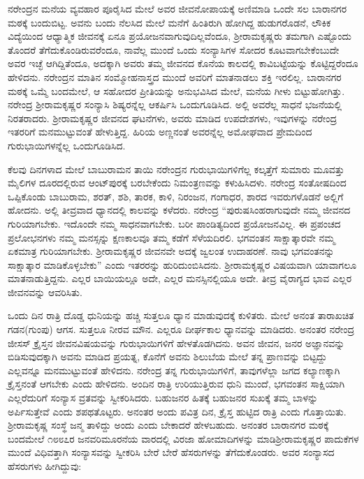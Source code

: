 ನರೇಂದ್ರನ ಮನೆಯ ವ್ಯವಹಾರ ಪೂರೈಸಿದ ಮೇಲೆ ಅವರ ಜೀವನೋಪಾಯಕ್ಕೆ ಅಣಿಮಾಡಿ ಒಂದೇ ಸಲ ಬಾರಾನಗರ ಮಠಕ್ಕೆ ಬಂದುಬಿಟ್ಟ. ಅವನು ಬಂದು ನೆಲಸಿದ ಮೇಲೆ ಮನೆಗೆ ಹಿಂತಿರುಗಿ ಹೋಗಿದ್ದ ಹುಡುಗರೊಡನೆ, ಲೌಕಿಕ ವಿದ್ಯೆಯಿಂದ ಆಧ್ಯಾತ್ಮಿಕ ಜೀವನಕ್ಕೆ ಏನೂ ಪ್ರಯೋಜನವಾಗುವುದಿಲ್ಲವೆಂದೂ, ಶ‍್ರೀರಾಮಕೃಷ್ಣರು ತಮಗಾಗಿ ಎಷ್ಟೊಂದು ತೊಂದರೆ ತೆಗೆದುಕೊಂಡಿರುವರೆಂದೂ, ನಾವೆಲ್ಲ ಮುಂದೆ ಒಂದು ಸಂನ್ಯಾಸಿಗಳ ಸೋದರ ಕೂಟವಾಗಬೇಕೆಂಬುದೇ ಅವರ ಇಚ್ಛೆ ಆಗಿದ್ದಿತೆಂದೂ, ಅದಕ್ಕಾಗಿ ಅವರು ತಮ್ಮ ಜೀವನದ ಕೊನೆಯ ಕಾಲದಲ್ಲಿ ಕಾವಿಬಟ್ಟೆಯನ್ನು ಕೊಟ್ಟಿದ್ದರೆಂದೂ ಹೇಳಿದನು. ನರೇಂದ್ರನ ಮಾತಿನ ಸಂಮ್ಮೋಹನಾಸ್ತ್ರದ ಮುಂದೆ ಅವರಿಗೆ ಮಾತನಾಡಲು ಶಕ್ತಿ ಇರಲಿಲ್ಲ. ಬಾರಾನಗರ ಮಠಕ್ಕೆ ಒಮ್ಮೆ ಬಂದಮೇಲೆ, ಆ ಸಹೋದರ ಪ್ರೀತಿಯನ್ನು ಅನುಭವಿಸಿದ ಮೇಲೆ, ಮನೆಯ ಗೀಳು ಬಿಟ್ಟುಹೋಗಿತ್ತು. ನರೇಂದ್ರ ಶ‍್ರೀರಾಮಕೃಷ್ಣರ ಸಂನ್ಯಾಸಿ ಶಿಷ್ಯರನ್ನೆಲ್ಲ ಆಕರ್ಷಿಸಿ ಒಂದುಗೂಡಿಸಿದ. ಅಲ್ಲಿ ಅವರೆಲ್ಲ ಸಾಧನೆ ಭಜನೆಯಲ್ಲಿ ನಿರತರಾದರು. ಶ‍್ರೀರಾಮಕೃಷ್ಣರ ಜೀವನದ ಘಟನೆಗಳು, ಅವರು ಮಾಡಿದ ಉಪದೇಶಗಳು, ಇವುಗಳನ್ನು ನರೇಂದ್ರ ಇತರರಿಗೆ ಮನಮುಟ್ಟುವಂತೆ ಹೇಳುತ್ತಿದ್ದ. ಹಿರಿಯ ಅಣ್ಣನಂತೆ ಅವರನ್ನೆಲ್ಲ ಅಮೋಘವಾದ ಪ್ರೇಮದಿಂದ ಗುರುಭಾಯಿಗಳನ್ನೆಲ್ಲ ಒಂದುಗೂಡಿಸಿದ.

ಕೆಲವು ದಿನಗಳಾದ ಮೇಲೆ ಬಾಬುರಾಮನ ತಾಯಿ ನರೇಂದ್ರನ ಗುರುಭಾಯಿಗಳಿಗೆಲ್ಲ ಕಲ್ಕತ್ತೆಗೆ ಸುಮಾರು ಮೂವತ್ತು ಮೈಲಿಗಳ ದೂರದಲ್ಲಿರುವ ಆಂಟ್​ಪುರಕ್ಕೆ ಬರಬೇಕೆಂದು ನಿಮಂತ್ರಣವನ್ನು ಕಳುಹಿಸಿದಳು. ನರೇಂದ್ರ ಸಂತೋಷದಿಂದ ಒಪ್ಪಿಕೊಂಡು ಬಾಬುರಾಮ, ಶರತ್, ಶಶಿ, ತಾರಕ, ಕಾಳಿ, ನಿರಂಜನ, ಗಂಗಾಧರ, ಶಾರದ ಇವರುಗಳೊಡನೆ ಅಲ್ಲಿಗೆ ಹೋದನು. ಅಲ್ಲಿ ತೀವ್ರವಾದ ಧ್ಯಾನದಲ್ಲಿ ಕಾಲವನ್ನು ಕಳೆದರು. ನರೇಂದ್ರ “ಪುರುಷಸಿಂಹರಾಗುವುದೇ ನಮ್ಮ ಜೀವನದ ಗುರಿಯಾಗಬೇಕು. ಇದೊಂದೇ ನಮ್ಮ ಸಾಧನವಾಗಬೇಕು. ಬರೀ ಪಾಂಡಿತ್ಯದಿಂದ ಪ್ರಯೋಜನವಿಲ್ಲ. ಈ ಪ್ರಪಂಚದ ಪ್ರಲೋಭನಗಳು ನಮ್ಮ ಮನಸ್ಸನ್ನು ಕ್ಷಣಕಾಲವೂ ತಮ್ಮ ಕಡೆಗೆ ಸೆಳೆಯದಿರಲಿ. ಭಗವಂತನ ಸಾಕ್ಷಾತ್ಕಾರವೇ ನಮ್ಮ ಏಕಮಾತ್ರ ಗುರಿಯಾಗಬೇಕು. ಶ‍್ರೀರಾಮಕೃಷ್ಣರ ಜೀವನವೇ ಅದಕ್ಕೆ ಜ್ವಲಂತ ಉದಾಹರಣೆ. ನಾವು ಭಗವಂತನನ್ನು ಸಾಕ್ಷಾತ್ಕಾರ ಮಾಡಿಕೊಳ್ಳಬೇಕು” ಎಂದು ಇತರರನ್ನು ಹುರಿದುಂಬಿಸಿದನು. ಶ‍್ರೀರಾಮಕೃಷ್ಣರ ವಿಷಯವಾಗಿ ಯಾವಾಗಲೂ ಮಾತನಾಡುತ್ತಿದ್ದನು. ಎಲ್ಲರ ಬಾಯಿಯಲ್ಲೂ ಅದೇ, ಎಲ್ಲರ ಮನಸ್ಸಿನಲ್ಲಿಯೂ ಅದೇ. ತೀವ್ರ ವೈರಾಗ್ಯದ ಭಾವ ಎಲ್ಲರ ಜೀವನವನ್ನು ಆವರಿಸಿತು.

ಒಂದು ದಿನ ರಾತ್ರಿ ದೊಡ್ಡ ಧುನಿಯನ್ನು ಹಚ್ಚಿ ಸುತ್ತಲೂ ಧ್ಯಾನ ಮಾಡುವುದಕ್ಕೆ ಕುಳಿತರು. ಮೇಲೆ ಅನಂತ ತಾರಾಖಚಿತ ಗಡನ(ಗುಂಪು) ಆಗಸ. ಸುತ್ತಲೂ ನೀರವ ಮೌನ. ಎಲ್ಲರೂ ದೀರ್ಘಕಾಲ ಧ್ಯಾನವನ್ನು ಮಾಡಿದರು. ಅನಂತರ ನರೇಂದ್ರ ಜೀಸಸ್ ಕ್ರೈಸ್ತನ ಜೀವನವಿಷಯವನ್ನು ಗುರುಭಾಯಿಗಳಿಗೆ ಹೇಳತೊಡಗಿದನು. ಅವನ ಜೀವನ, ಜನರ ಅಜ್ಞಾನವನ್ನು ಬಿಡಿಸುವುದಕ್ಕಾಗಿ ಅವನು ಮಾಡಿದ ಪ್ರಯತ್ನ, ಕೊನೆಗೆ ಅವನು ಶಿಲುಬೆಯ ಮೇಲೆ ತನ್ನ ಪ್ರಾಣವನ್ನು ಬಿಟ್ಟದ್ದು ಎಲ್ಲವನ್ನೂ ಮನಮುಟ್ಟುವಂತೆ ಹೇಳಿದನು. ನರೇಂದ್ರ ತನ್ನ ಗುರುಭಾಯಿಗಳಿಗೆ, ತಾವುಗಳೆಲ್ಲಾ ಜಗದ ಕಲ್ಯಾಣಕ್ಕಾಗಿ ಕ್ರೈಸ್ತನಂತೆ ಆಗಬೇಕು ಎಂದು ಹೇಳಿದನು. ಅಂದಿನ ರಾತ್ರಿ ಉರಿಯುತ್ತಿರುವ ಧುನಿ ಮುಂದೆ, ಭಗವಂತನ ಸಾಕ್ಷಿಯಾಗಿ ಎಲ್ಲರೆದುರಿಗೆ ಸಂನ್ಯಾಸ ವ್ರತವನ್ನು ಸ್ವೀಕರಿಸಿದರು. ಬಹುಜನರ ಹಿತಕ್ಕೆ ಬಹುಜನರ ಸುಖಕ್ಕೆ ತಮ್ಮ ಬಾಳನ್ನು ಅರ್ಪಿಸುತ್ತೇವೆ ಎಂದು ಶಪಥತೊಟ್ಟರು. ಅನಂತರ ಅಂದು ಪವಿತ್ರ ದಿನ, ಕ್ರೈಸ್ತ ಹುಟ್ಟಿದ ರಾತ್ರಿ ಎಂದು ಗೊತ್ತಾಯಿತು. ಶ‍್ರೀರಾಮಕೃಷ್ಣ ಸಂಸ್ಥೆ ಜನ್ಮ ತಾಳಿದ್ದು ಅಂದು ಎಂದು ಬೇಕಾದರೆ ಹೇಳಬಹುದು. ಅನಂತರ ಬಾರಾನಗರ ಮಠಕ್ಕೆ ಬಂದಮೇಲೆ ೧೮೮೭ರ ಜನವರಿ\break ಮೂರನೆಯ ವಾರದಲ್ಲಿ ವಿರಜಾ ಹೋಮಾದಿಗಳನ್ನು ಮಾಡಿ\break ಶ‍್ರೀರಾಮಕೃಷ್ಣರ ಪಾದುಕೆಗಳ ಮುಂದೆ ವಿಧಿವತ್ತಾಗಿ ಸಂನ್ಯಾಸವನ್ನು ಸ್ವೀಕರಿಸಿ ಬೇರೆ ಬೇರೆ ಹೆಸರುಗಳನ್ನು ತೆಗೆದುಕೊಂಡರು. ಅವರ ಸಂನ್ಯಾಸದ ಹೆಸರುಗಳು ಹೀಗಿದ್ದುವು:

